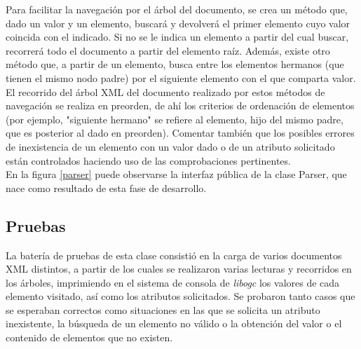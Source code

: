 Para facilitar la navegación por el árbol del documento, se crea un método que, dado un valor y un elemento, buscará y devolverá el primer elemento cuyo valor coincida con el indicado. Si no se le indica un elemento a partir del cual buscar, recorrerá todo el documento a partir del elemento raíz. Además, existe otro método que, a partir de un elemento, busca entre los elementos hermanos (que tienen el mismo nodo padre) por el siguiente elemento con el que comparta valor.\\

El recorrido del árbol XML del documento realizado por estos métodos de navegación se realiza en preorden, de ahí los criterios de ordenación de elementos (por ejemplo, "siguiente hermano" se refiere al elemento, hijo del mismo padre, que es posterior al dado en preorden). Comentar también que los posibles errores de inexistencia de un elemento con un valor dado o de un atributo solicitado están controlados haciendo uso de las comprobaciones pertinentes.\\

En la figura \ref{parser} puede observarse la interfaz pública de la clase Parser, que nace como resultado de esta fase de desarrollo.\\


\subsection{Pruebas}

La batería de pruebas de esta clase consistió en la carga de varios documentos XML distintos, a partir de los cuales se realizaron varias lecturas y recorridos en los árboles, imprimiendo en el sistema de consola de \emph{libogc} los valores de cada elemento visitado, así como los atributos solicitados. Se probaron tanto casos que se esperaban correctos como situaciones en las que se solicita un atributo inexistente, la búsqueda de un elemento no válido o la obtención del valor o el contenido de elementos que no existen.

